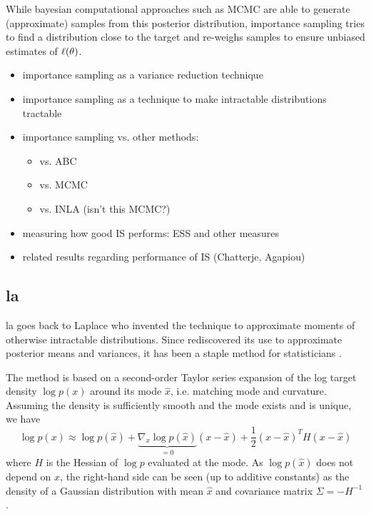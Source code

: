 While bayesian computational approaches such as MCMC are able to generate (approximate) samples from this posterior distribution, importance sampling tries to find a distribution close to the target and re-weighs samples to ensure unbiased estimates of $\ell(\theta)$.

\begin{itemize}
    \item importance sampling as a variance reduction technique
    \item importance sampling as a technique to make intractable distributions tractable
    \item importance sampling vs. other methods:
          \begin{itemize}
              \item vs. ABC
              \item vs. MCMC
              \item vs. INLA (isn't this MCMC?)
          \end{itemize}
    \item measuring how good IS performs: ESS and other measures
    \item related results regarding performance of IS (Chatterje, Agapiou)
\end{itemize}

\subsection{\acrfull{la}}

\acrfull{la} goes back to Laplace \cite{Laplace1986Memoir} who invented the technique to approximate moments of otherwise intractable distributions. Since \cite{Tierney1986Accurate,Tierney1989Fully} rediscovered its use to approximate posterior means and variances, it has been a staple method for statisticians .

The method is based on a second-order Taylor series expansion of the log target density $\log p(x)$ around its mode $\hat x$, i.e. matching mode and curvature. Assuming the density is sufficiently smooth and the mode exists and is unique, we have
$$
\log p(x) \approx \log p(\hat x) + \underbrace{\nabla_{x} \log p (\hat x)}_{= 0} \left( x - \hat x \right) + \frac{1}{2} (x - \hat x)^{T} H (x - \hat x)
$$
where $H$ is the Hessian of $\log p$ evaluated at the mode. As $\log p (\hat x)$ does not depend on $x$, the right-hand side can be seen (up to additive constants) as the density of a Gaussian distribution with mean $\hat x$ and covariance matrix $\Sigma = - H^{-1}$. 

